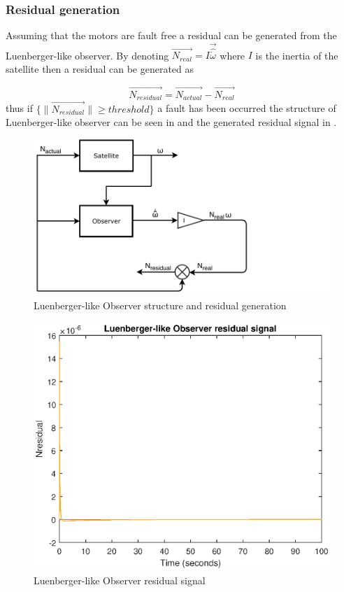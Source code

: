 \subsubsection{Residual generation}
 \label{sec:simpleObserveresidual}
 Assuming that the motors are fault free a residual can be generated from the Luenberger-like observer. By denoting $\vec{N_{real}} =I\vec{\hat{{\dot \omega}}}$ where $I$ is the inertia of the satellite then a residual can be generated as

 \begin{equation}
 \vec{N_{residual}} = \vec{N_{actual}} - \vec{N_{real}}
 \label{eq:residualObs}
 \end{equation}
 thus if $\{\lVert \vec{N_{residual}}\rVert \geq threshold \}$ a fault has been occurred the structure of Luenberger-like observer can be seen in  and the generated residual signal in  . 
 \begin{figure}[H]
 	\vspace*{1cm}
 	\hspace*{3cm}\includegraphics[width=0.9\linewidth]{figures/Observer}\hspace*{-3cm}
 	\caption{Luenberger-like Observer structure and residual generation   }
 	\label{fig:observer}
 \end{figure}
%
\begin{figure}[H]
	\centering
	\includegraphics[width=0.9\linewidth]{figures/Observer_residual}
	\caption{Luenberger-like Observer residual signal }
	\label{fig:observerresidual}
\end{figure}
